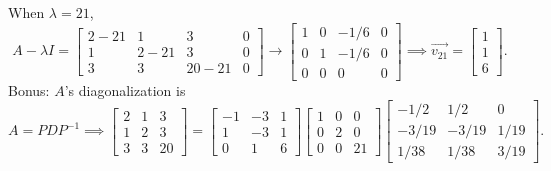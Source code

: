 When $\lambda = 21$,
\begin{equation*}
	A-\lambda I = \left[
	\begin{array}{ccc|c}
		2-21 & 1 & 3 & 0 \\
		1 & 2-21 & 3 & 0 \\
		3 & 3 & 20-21 & 0
	\end{array} 
	\right] \to \left[
	\begin{array}{ccc|c}
		1 & 0 & -1/6 & 0 \\
		0 & 1 & -1/6 & 0 \\
		0 & 0 & 0 & 0
	\end{array}
	\right] \implies \vec{v_{21}} = \begin{bmatrix}
		1 \\
		1 \\
		6
	\end{bmatrix}.
\end{equation*}
Bonus: $A$'s diagonalization is
\begin{equation*}
	A = PDP^{-1} \implies \begin{bmatrix}
		2 & 1 & 3 \\
		1 & 2 & 3 \\
		3 & 3 & 20
	\end{bmatrix} = \begin{bmatrix}
		-1 & -3 & 1 \\
		1 & -3 & 1 \\
		0 & 1 & 6
	\end{bmatrix} \begin{bmatrix}
		1 & 0 & 0 \\
		0 & 2 & 0 \\
		0 & 0 & 21
	\end{bmatrix} \begin{bmatrix}
		-1/2 & 1/2 & 0 \\
		-3/19 & -3/19 & 1/19 \\
		1/38 & 1/38 & 3/19
	\end{bmatrix}.
\end{equation*}